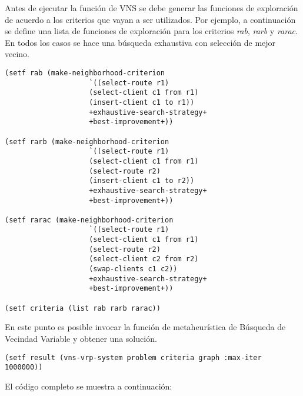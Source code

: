 Antes de ejecutar la función de VNS se debe generar las funciones de exploración de acuerdo a los criterios que vayan a ser utilizados. Por ejemplo, a continuación se define una lista de funciones de exploración para los criterios \textit{rab}, \textit{rarb} y \textit{rarac}. En todos los casos se hace una búsqueda exhaustiva con selección de mejor vecino.

\begin{lstlisting}
(setf rab (make-neighborhood-criterion 
					`((select-route r1)
					(select-client c1 from r1)
					(insert-client c1 to r1))
					+exhaustive-search-strategy+ 
					+best-improvement+))

(setf rarb (make-neighborhood-criterion 
					`((select-route r1)
					(select-client c1 from r1)
					(select-route r2)
					(insert-client c1 to r2))
					+exhaustive-search-strategy+ 
					+best-improvement+))

(setf rarac (make-neighborhood-criterion 
					`((select-route r1)
					(select-client c1 from r1)
					(select-route r2)
					(select-client c2 from r2)
					(swap-clients c1 c2))
					+exhaustive-search-strategy+ 
					+best-improvement+))

(setf criteria (list rab rarb rarac))

\end{lstlisting}

En este punto es posible invocar la función de metaheurística de Búsqueda de Vecindad Variable y obtener una solución.

\begin{lstlisting}
(setf result (vns-vrp-system problem criteria graph :max-iter 1000000))
\end{lstlisting}

El código completo se muestra a continuación:

